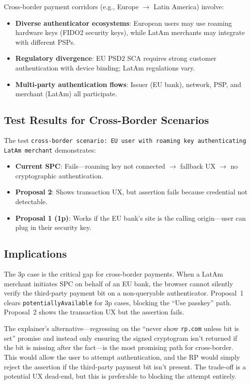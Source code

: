 \documentclass[12pt,a4paper]{article}
\begin{document}
Cross-border payment corridors (e.g., Europe $\to$ Latin America) involve:
\begin{itemize}[noitemsep,topsep=2pt]
  \item \textbf{Diverse authenticator ecosystems}: European users may use roaming hardware keys (FIDO2 security keys), while LatAm merchants may integrate with different PSPs.
  \item \textbf{Regulatory divergence}: EU PSD2 SCA requires strong customer authentication with device binding; LatAm regulations vary.
  \item \textbf{Multi-party authentication flows}: Issuer (EU bank), network, PSP, and merchant (LatAm) all participate.
\end{itemize}

\subsection{Test Results for Cross-Border Scenarios}

The test \texttt{cross-border scenario: EU user with roaming key authenticating LatAm merchant} demonstrates:
\begin{itemize}[noitemsep,topsep=2pt]
  \item \textbf{Current SPC}: Fails---roaming key not connected $\to$ fallback UX $\to$ no cryptographic authentication.
  \item \textbf{Proposal 2}: Shows transaction UX, but assertion fails because credential not detectable.
  \item \textbf{Proposal 1 (1p)}: Works if the EU bank's site is the calling origin---user can plug in their security key.
\end{itemize}

\subsection{Implications}

The 3p case is the critical gap for cross-border payments. When a LatAm merchant initiates SPC on behalf of an EU bank, the browser cannot silently verify the third-party payment bit on a non-queryable authenticator. Proposal~1 clears \texttt{potentiallyAvailable} for 3p cases, blocking the ``Use passkey'' path. Proposal~2 shows the transaction UX but the assertion fails.

The explainer's alternative---regressing on the ``never show \texttt{rp.com} unless bit is set'' promise and instead only ensuring the signed cryptogram isn't returned if the bit is missing after the fact---is the most promising path for cross-border. This would allow the user to attempt authentication, and the RP would simply reject the assertion if the third-party payment bit isn't present. The trade-off is a potential UX dead-end, but this is preferable to blocking the attempt entirely.
\end{document}
